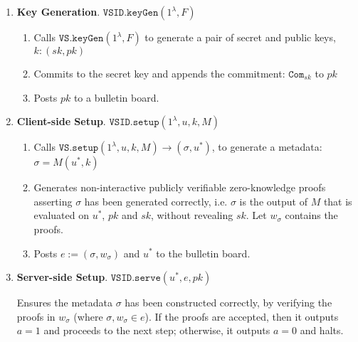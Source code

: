 

\begin{enumerate}
\item\textbf{Key Generation}\label{VSID::keygen}. $\mathtt{VSID.keyGen}(1^{\lambda},F)$ 
\begin{enumerate}
\item Calls  $\mathtt{VS.keyGen}(1^{\lambda},F)$ to generate a pair of secret and public keys, $k:(sk,pk)$
\item Commits to the secret key and appends the commitment: $\mathtt{Com}_{\scriptscriptstyle sk}$ to $pk$
\item Posts $pk$ to a bulletin board. %
\end{enumerate}

\item\textbf{Client-side Setup}\label{VSID::Client-side-Setup}. $\mathtt{VSID.setup}(1^{\lambda}, u,k,M)$
\begin{enumerate}
\item Calls  $\mathtt{VS.setup}(1^{\lambda}, u,k,M)\rightarrow (\sigma,u^{\scriptscriptstyle *})$, to generate a   metadata: $\sigma=M(u^{\scriptscriptstyle *},k)$

\item Generates non-interactive publicly verifiable zero-knowledge proofs asserting  $\sigma$ has been generated correctly, i.e. $\sigma$ is the output of  $M$ that is evaluated on $u^{\scriptscriptstyle *}$, $pk$ and $sk$, without revealing $sk$. Let $w_{\scriptscriptstyle\sigma}$ contains the proofs.
\item\label{vsid::post-metadata} Posts $e:=(\sigma,w_{\scriptscriptstyle\sigma})$ and $u^{\scriptscriptstyle *}$ to the bulletin board. 
\end{enumerate}

\item\textbf{Server-side Setup}. $\mathtt{VSID.serve}(u^{\scriptscriptstyle *},e,pk)$

Ensures the metadata $\sigma$ has been constructed correctly, by verifying the proofs in $w_{\sigma}$ (where $\sigma,w_{\scriptscriptstyle\sigma}\in e$). If the proofs are accepted, then it outputs $a=1$  and proceeds to the next step; otherwise, it outputs $a=0$ and halts. 



\end{enumerate}
